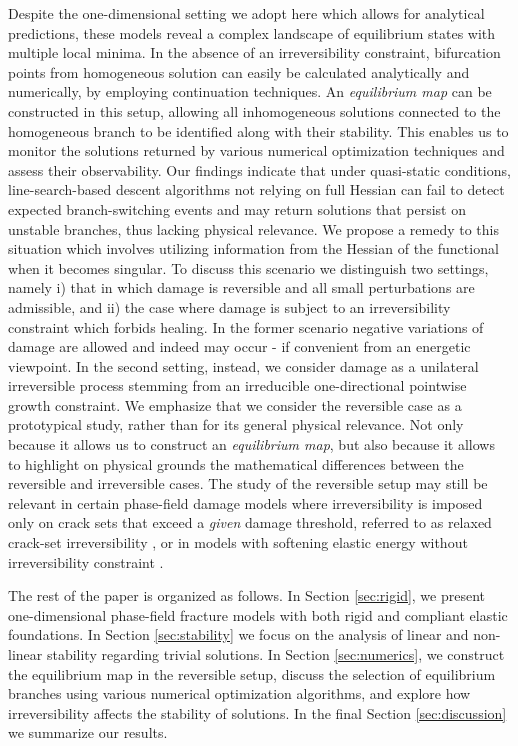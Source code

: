 \documentclass[10pt]{article}
\begin{document}
Despite the one-dimensional setting we adopt here which allows for analytical predictions, these models reveal a complex landscape of equilibrium states with multiple local minima.
%
In the absence of an irreversibility constraint, bifurcation points from homogeneous solution can easily be calculated analytically and numerically, by employing continuation techniques.
%
An \emph{equilibrium map} can be constructed in this setup, allowing all  {inhomogeneous} solutions connected to the homogeneous branch to be identified along with their stability. This enables us to monitor the solutions returned by various numerical optimization techniques and assess their observability.
%
 Our findings indicate that under quasi-static conditions, line-search-based descent algorithms not relying on full Hessian can fail to detect expected branch-switching events and may return solutions that persist on unstable branches, thus lacking physical relevance. 
We propose a remedy to this situation which involves utilizing information from the Hessian of the functional when it becomes singular. 
%
To discuss this scenario we distinguish two settings, namely i) that in which damage is reversible and all small perturbations are admissible, and ii) the case where damage is subject to an irreversibility constraint which forbids healing. In the former scenario  negative variations of damage are allowed and indeed may occur - if convenient from an energetic viewpoint. In the second setting, instead, we consider damage as a unilateral irreversible process stemming from an irreducible one-directional pointwise growth constraint.
{We emphasize that we consider the reversible case as a prototypical study, rather than for its general physical relevance. Not only because it allows us to construct an \emph{equilibrium map}, but also because it allows to highlight on physical grounds the mathematical differences between the reversible and irreversible cases. The study of the reversible setup may still be relevant in certain phase-field damage models where irreversibility is imposed only on crack sets that exceed a \emph{given} damage threshold, referred to as relaxed crack-set irreversibility \cite{Bourdin2000-pc, Kumar2020-xz, De-Lorenzis2020-rz}, or  in models with softening elastic energy without irreversibility constraint \cite{Truskinovsky2010-st,Salman2019-kp,Salman2021-mn,Baggio2023-yo}.}


The rest of the paper is organized as follows. In Section \ref{sec:rigid}, we present one-dimensional phase-field fracture models with both rigid and compliant elastic foundations. In Section \ref{sec:stability} we focus on the analysis  of linear and non-linear stability regarding trivial solutions. In Section \ref{sec:numerics}, we construct the equilibrium map in the reversible setup, discuss the selection of equilibrium branches using various numerical optimization algorithms, and explore how irreversibility affects the stability of solutions. In the final Section \ref{sec:discussion}  we summarize our results.
\end{document}
